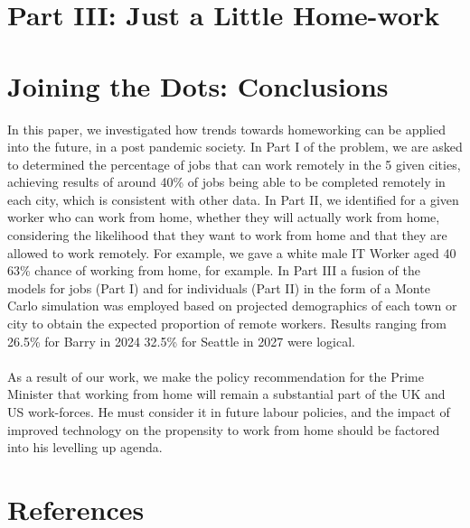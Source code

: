 \documentclass{mthree}
\begin{document}
    \section{Part III: Just a Little Home-work}
        
    \section{Joining the Dots: Conclusions}
    
       In this paper, we investigated how trends towards homeworking can be applied into the future, in a post pandemic society. In Part I of the problem, we are asked to determined the percentage of jobs that can work remotely in the 5 given cities, achieving results of around 40\% of jobs being able to be completed remotely in each city, which is consistent with other data. In Part II, we identified for a given worker who can work from home, whether they will actually work from home, considering the likelihood that they want to work from home and that they are allowed to work remotely. For example, we gave a white male IT Worker aged 40 63\% chance of working from home, for example. In Part III a fusion of the models for jobs (Part I) and for individuals (Part II) in the form of a Monte Carlo simulation was employed based on projected demographics of each town or city to obtain the expected proportion of remote workers. Results ranging from 26.5\% for Barry in 2024 32.5\% for Seattle in 2027 were logical.
       \\ \\
       As a result of our work, we make the policy recommendation for the Prime Minister that working from home will remain a substantial part of the UK and US work-forces. He must consider it in future labour policies, and the impact of improved technology on the propensity to work from home should be factored into his levelling up agenda. 
    \newpage
    \section{References} %
        \nocite{keyes_2021} %
        \nocite{given_data} %
        \begingroup
            \renewcommand{\section}[2]{} %
            
                        
        \endgroup
      
\end{document}
